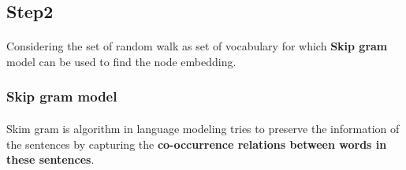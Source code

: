 \subsection{Step2}
\paragraph{} Considering the set of random walk as set of vocabulary for which \textbf{Skip gram} model can be used to find the node embedding.
\subsubsection{Skip gram model}
\paragraph{} Skim gram is algorithm in language modeling tries to preserve the information of the sentences by capturing the \textbf{co-occurrence relations between words in these sentences}.


    